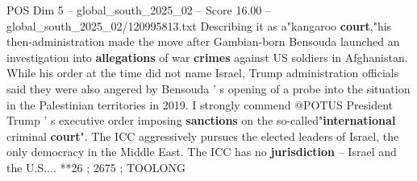 \begin{textsample}{POS Dim 5 – global\_south\_2025\_02 – Score 16.00 – global\_south\_2025\_02/120995813.txt}
Describing it as a"kangaroo \textbf{court},"his then-administration made the move after Gambian-born Bensouda launched an investigation into \textbf{allegations} of war \textbf{crimes} against US soldiers in Afghanistan.
While his order at the time did not name Israel, Trump administration officials said they were also angered by Bensouda ' s opening of a probe into the situation in the Palestinian territories in 2019.
I strongly commend @POTUS President Trump ' s executive order imposing \textbf{sanctions} on the so-called"\textbf{international} criminal \textbf{court}".
The ICC aggressively pursues the elected leaders of Israel, the only democracy in the Middle East.
The ICC has no \textbf{jurisdiction} -- Israel and the U.S.... **26 ; 2675 ; TOOLONG

\end{textsample}
